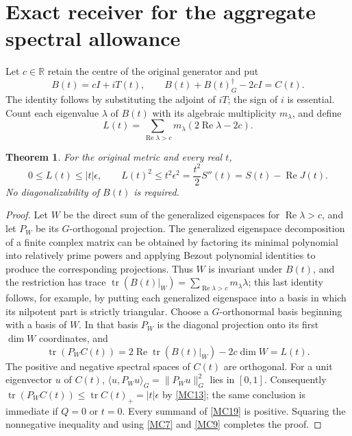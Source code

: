\documentclass[11pt]{article}
\newtheorem{theorem}{Theorem}
\newcommand{\tr}{\operatorname{tr}}
\newcommand{\Rea}{\operatorname{Re}}
\newcommand{\adj}{\dagger_G}
\begin{document}
\section{Exact receiver for the aggregate spectral allowance}

Let \(c\in\mathbb R\) retain the centre of the original generator and put
\begin{equation}
 B(t)=cI+iT(t),\qquad
 B(t)+B(t)^\adj-2cI=C(t).
 \tag{MC18}\label{MC18}
\end{equation}
The identity follows by substituting the adjoint of \(iT\);
the sign of \(i\) is essential. Count each eigenvalue \(\lambda\)
of \(B(t)\) with its algebraic multiplicity \(m_\lambda\), and define
\begin{equation}
 L(t)=\sum_{\Rea\lambda>c}m_\lambda(2\Rea\lambda-2c).
 \tag{MC19}\label{MC19}
\end{equation}

\begin{theorem}
For the original metric and every real \(t\),
\begin{equation}
 0\le L(t)\le |t|\epsilon,\qquad
 L(t)^2\le t^2\epsilon^2
      =\frac{t^2}{2}S''(t)
      =S(t)-\Rea J(t).
 \tag{MC20}\label{MC20}
\end{equation}
No diagonalizability of \(B(t)\) is required.
\end{theorem}
\begin{proof}
Let \(W\) be the direct sum of the generalized eigenspaces for
\(\Rea\lambda>c\), and let \(P_W\) be its \(G\)-orthogonal projection.
The generalized eigenspace decomposition of a finite complex matrix
can be obtained by factoring its minimal polynomial into relatively
prime powers and applying Bezout polynomial identities to produce the
corresponding projections. Thus \(W\) is invariant under \(B(t)\),
and the restriction has trace
\(\tr(B(t)|_W)=\sum_{\Rea\lambda>c}m_\lambda\lambda\);
this last identity follows, for example, by putting each generalized
eigenspace into a basis in which its nilpotent part is strictly triangular.
Choose a \(G\)-orthonormal basis beginning with a basis of \(W\).
In that basis \(P_W\) is the diagonal projection onto its first
\(\dim W\) coordinates, and
\[
 \tr(P_W C(t))
   =2\Rea\tr(B(t)|_W)-2c\dim W=L(t).
\]
The positive and negative spectral spaces of \(C(t)\) are orthogonal.
For a unit eigenvector \(u\) of \(C(t)\),
\(\langle u,P_Wu\rangle_G=\|P_Wu\|_G^2\) lies in \([0,1]\).
Consequently
\(\tr(P_W C(t))\le\tr C(t)_+=|t|\epsilon\) by \eqref{MC13};
the same conclusion is immediate if \(Q=0\) or \(t=0\).
Every summand of \eqref{MC19} is positive. Squaring the nonnegative
inequality and using \eqref{MC7} and \eqref{MC9} completes the proof.
\end{proof}
\end{document}
